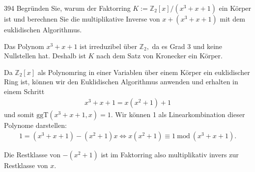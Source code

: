 \begin{algebraUE}{394}
  Begründen Sie, warum der Faktorring $K := \mathbb{Z}_2[x]/(x^3 + x + 1)$ ein Körper ist und
   berechnen Sie die multiplikative Inverse von $x + (x^3 + x + 1)$ mit dem euklidischen Algorithmus.

\end{algebraUE}

\begin{solution}
  Das Polynom $x^3 + x + 1$ ist irreduzibel über $\mathbb{Z}_2,$ da es Grad 3 und keine Nullstellen hat. Deshalb ist $K$ nach dem Satz von Kronecker ein Körper.

  Da $\mathbb{Z}_2[x]$ als Polynomring in einer Variablen über einem Körper ein euklidischer Ring ist, können wir den Euklidischen Algorithmus anwenden und erhalten in einem Schritt
  \begin{align}
x^3 + x + 1 = x(x^2 + 1) + 1
\end{align}
und somit $\mathrm{ggT}(x^3 + x + 1, x) = 1.$ Wir können 1 als Linearkombination dieser Polynome darstellen:
\begin{align}
    1 = (x^3 + x + 1) - (x^2 + 1)x \Longleftrightarrow x(x^2 + 1) \equiv 1 \mathrm{~mod~} (x^3 + x + 1).
\end{align}

Die Restklasse von $-(x^2+1)$ ist im Faktorring also multiplikativ invers zur Restklasse von $x$.
\end{solution}
